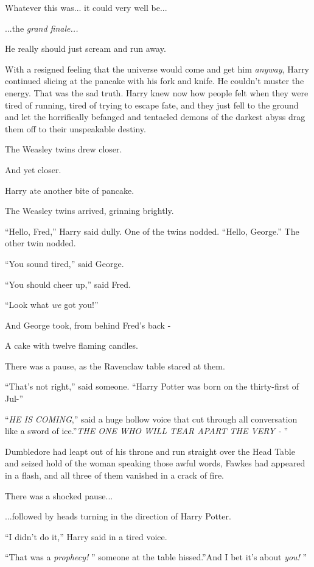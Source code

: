 Whatever this was... it could very well be...

...the \emph{grand finale...}

He really should just scream and run away.

With a resigned feeling that the universe would come and get him
\emph{anyway}, Harry continued slicing at the pancake with his fork and
knife. He couldn't muster the energy. That was the sad truth. Harry knew
now how people felt when they were tired of running, tired of trying to
escape fate, and they just fell to the ground and let the horrifically
befanged and tentacled demons of the darkest abyss drag them off to
their unspeakable destiny.

The Weasley twins drew closer.

And yet closer.

Harry ate another bite of pancake.

The Weasley twins arrived, grinning brightly.

``Hello, Fred,'' Harry said dully. One of the twins nodded. ``Hello,
George.'' The other twin nodded.

``You sound tired,'' said George.

``You should cheer up,'' said Fred.

``Look what \emph{we} got you!''

And George took, from behind Fred's back -

A cake with twelve flaming candles.

There was a pause, as the Ravenclaw table stared at them.

``That's not right,'' said someone. ``Harry Potter was born on the
thirty-first of Jul-''

``\emph{HE IS COMING},'' said a huge hollow voice that cut through all
conversation like a sword of ice.''\emph{THE ONE WHO WILL TEAR APART THE
VERY -} ''

Dumbledore had leapt out of his throne and run straight over the Head
Table and seized hold of the woman speaking those awful words, Fawkes
had appeared in a flash, and all three of them vanished in a crack of
fire.

There was a shocked pause...

...followed by heads turning in the direction of Harry Potter.

``I didn't do it,'' Harry said in a tired voice.

``That was a \emph{prophecy!} '' someone at the table hissed.''And I bet
it's about \emph{you!} ''

